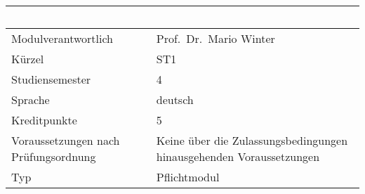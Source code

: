 \begin{longtable}[]{@{}ll@{}}
\toprule
\begin{minipage}[b]{0.12\columnwidth}\raggedright\strut
~\strut
\end{minipage} & \begin{minipage}[b]{0.12\columnwidth}\raggedright\strut
~\strut
\end{minipage}\tabularnewline
\midrule
\endhead
\begin{minipage}[t]{0.12\columnwidth}\raggedright\strut
Modulverantwortlich\strut
\end{minipage} & \begin{minipage}[t]{0.12\columnwidth}\raggedright\strut
Prof.~Dr.~Mario Winter\strut
\end{minipage}\tabularnewline
\begin{minipage}[t]{0.12\columnwidth}\raggedright\strut
Kürzel\strut
\end{minipage} & \begin{minipage}[t]{0.12\columnwidth}\raggedright\strut
ST1\strut
\end{minipage}\tabularnewline
\begin{minipage}[t]{0.12\columnwidth}\raggedright\strut
Studiensemester\strut
\end{minipage} & \begin{minipage}[t]{0.12\columnwidth}\raggedright\strut
4\strut
\end{minipage}\tabularnewline
\begin{minipage}[t]{0.12\columnwidth}\raggedright\strut
Sprache\strut
\end{minipage} & \begin{minipage}[t]{0.12\columnwidth}\raggedright\strut
deutsch\strut
\end{minipage}\tabularnewline
\begin{minipage}[t]{0.12\columnwidth}\raggedright\strut
Kreditpunkte\strut
\end{minipage} & \begin{minipage}[t]{0.12\columnwidth}\raggedright\strut
5\strut
\end{minipage}\tabularnewline
\begin{minipage}[t]{0.12\columnwidth}\raggedright\strut
Voraussetzungen nach Prüfungsordnung\strut
\end{minipage} & \begin{minipage}[t]{0.12\columnwidth}\raggedright\strut
Keine über die Zulassungsbedingungen hinausgehenden
Voraussetzungen\strut
\end{minipage}\tabularnewline
\begin{minipage}[t]{0.12\columnwidth}\raggedright\strut
Typ\strut
\end{minipage} & \begin{minipage}[t]{0.12\columnwidth}\raggedright\strut
Pflichtmodul\strut
\end{minipage}\tabularnewline
\bottomrule
\end{longtable}

